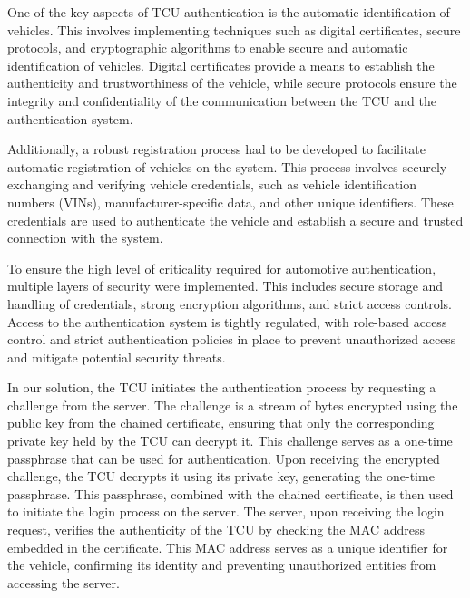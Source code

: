 \documentclass[
12pt,
oneside, 
onehalfspacing, 
nolistspacing, 
parskip, 
chapterinoneline, 
]{AASTCOMPUTER}
\begin{document}
One of the key aspects of TCU authentication is the automatic identification of vehicles. This involves implementing techniques such as digital certificates, secure protocols, and cryptographic algorithms to enable secure and automatic identification of vehicles. Digital certificates provide a means to establish the authenticity and trustworthiness of the vehicle, while secure protocols ensure the integrity and confidentiality of the communication between the TCU and the authentication system.

Additionally, a robust registration process had to be developed to facilitate automatic registration of vehicles on the system. This process involves securely exchanging and verifying vehicle credentials, such as vehicle identification numbers (VINs), manufacturer-specific data, and other unique identifiers. These credentials are used to authenticate the vehicle and establish a secure and trusted connection with the system.

To ensure the high level of criticality required for automotive authentication, multiple layers of security were implemented. This includes secure storage and handling of credentials, strong encryption algorithms, and strict access controls. Access to the authentication system is tightly regulated, with role-based access control and strict authentication policies in place to prevent unauthorized access and mitigate potential security threats.



In our solution, the TCU initiates the authentication process by requesting a challenge from the server. The challenge is a stream of bytes encrypted using the public key from the chained certificate, ensuring that only the corresponding private key held by the TCU can decrypt it. This challenge serves as a one-time passphrase that can be used for authentication. Upon receiving the encrypted challenge, the TCU decrypts it using its private key, generating the one-time passphrase. This passphrase, combined with the chained certificate, is then used to initiate the login process on the server. The server, upon receiving the login request, verifies the authenticity of the TCU by checking the MAC address embedded in the certificate. This MAC address serves as a unique identifier for the vehicle, confirming its identity and preventing unauthorized entities from accessing the server.
\end{document}
